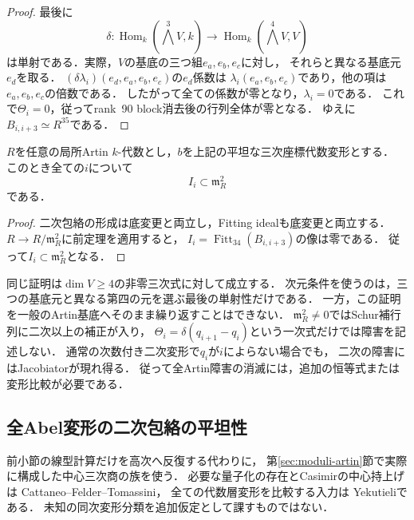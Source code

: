 \begin{proof}
最後に
\[
 \delta:\operatorname{Hom}_k(\bigwedge^3V,k)
 \longrightarrow\operatorname{Hom}_k(\bigwedge^4V,V)
\]
は単射である．実際，$V$の基底の三つ組$e_a,e_b,e_c$に対し，
それらと異なる基底元$e_d$を取る．
$(\delta\lambda_i)(e_d,e_a,e_b,e_c)$の$e_d$係数は
$\lambda_i(e_a,e_b,e_c)$であり，他の項は$e_a,e_b,e_c$の倍数である．
したがって全ての係数が零となり，$\lambda_i=0$である．
これで$\Theta_i=0$，従ってrank~90 block消去後の行列全体が零となる．
ゆえに$B_{i,i+3}\simeq R^{35}$である．
\end{proof}

\begin{corollary}[一般Artin基底での障害idealの次数]
\label{cor:abel-obstruction-no-linear-term}
$R$を任意の局所Artin $k$-代数とし，$b$を上記の平坦な三次座標代数変形とする．
このとき全ての$i$について
\[
 I_i\subset\mathfrak m_R^2
\]
である．
\end{corollary}
\begin{proof}
二次包絡の形成は底変更と両立し，Fitting idealも底変更と両立する．
$R\to R/\mathfrak m_R^2$に前定理を適用すると，
$I_i=\operatorname{Fitt}_{34}(B_{i,i+3})$の像は零である．
従って$I_i\subset\mathfrak m_R^2$となる．
\end{proof}

\begin{remark}[次元と高次の範囲]
同じ証明は$\dim V\geq4$の非零三次式に対して成立する．
次元条件を使うのは，三つの基底元と異なる第四の元を選ぶ最後の単射性だけである．
一方，この証明を一般のArtin基底へそのまま繰り返すことはできない．
$\mathfrak m_R^2\ne0$ではSchur補行列に二次以上の補正が入り，
$\Theta_i=\delta(q_{i+1}-q_i)$という一次式だけでは障害を記述しない．
通常の次数付き二次変形で$q_i$が$i$によらない場合でも，
二次の障害にはJacobiatorが現れ得る．
従って全Artin障害の消滅には，追加の恒等式または変形比較が必要である．
\end{remark}

\subsection{全Abel変形の二次包絡の平坦性}
\label{subsec:abel-all-flat-envelope}

前小節の線型計算だけを高次へ反復する代わりに，
第\ref{sec:moduli-artin}節で実際に構成した中心三次商の族を使う．
必要な量子化の存在とCasimirの中心持上げは
Cattaneo--Felder--Tomassini\cite[\S3, Proposition~3.3 and Corollary~5.2(iv)]{CFT}，
全ての代数層変形を比較する入力は
Yekutieli\cite[Corollary~11.2]{YekutieliTwisted}である．
未知の同次変形分類を追加仮定として課すものではない．

